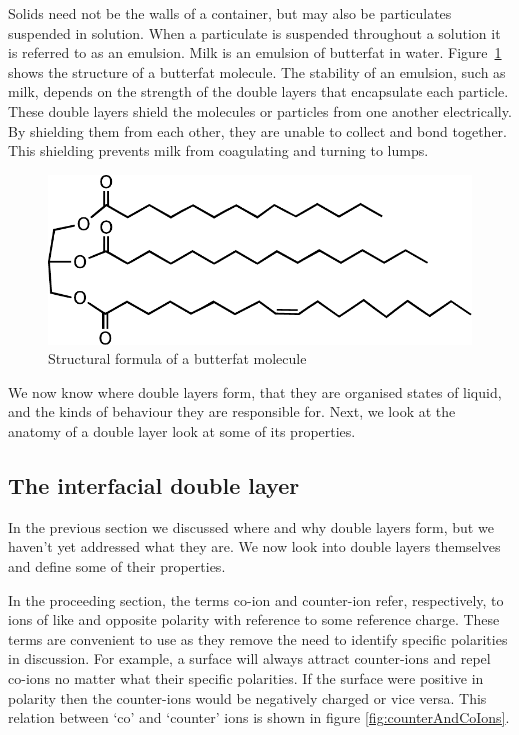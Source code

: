     Solids need not be the walls of a container, but may also be particulates suspended in solution.
    When a particulate is suspended throughout a solution it is referred to as an emulsion.
    Milk is an emulsion of butterfat in water.
    Figure~\ref{fig:butterfat} shows the structure of a butterfat molecule.
    The stability of an emulsion, such as milk, depends on the strength of the double layers that encapsulate each particle.
    These double layers shield the molecules or particles from one another electrically.
    By shielding them from each other, they are unable to collect and bond together.
    This shielding prevents milk from coagulating and turning to lumps.

    \begin{figure}
        \begin{center}
            \includegraphics[scale=0.8]{content/introduction/graphics/butterfat}
        \end{center}
        \caption{Structural formula of a butterfat molecule}
        \label{fig:butterfat}
    \end{figure}

    We now know where double layers form, that they are organised states of liquid, and the kinds of behaviour they are responsible for.
    Next, we look at the anatomy of a double layer look at some of its properties.

  \subsection{The interfacial double layer}

    In the previous section we discussed where and why double layers form, but we haven't yet addressed what they are.
    We now look into double layers themselves and define some of their properties.

    In the proceeding section, the terms co-ion and counter-ion refer, respectively, to ions of like and opposite polarity with reference to some reference charge.
    These terms are convenient to use as they remove the need to identify specific polarities in discussion.
    For example, a surface will always attract counter-ions and repel co-ions no matter what their specific polarities.
    If the surface were positive in polarity then the counter-ions would be negatively charged or vice versa.
    This relation between `co' and `counter' ions is shown in figure \ref{fig:counterAndCoIons}.

